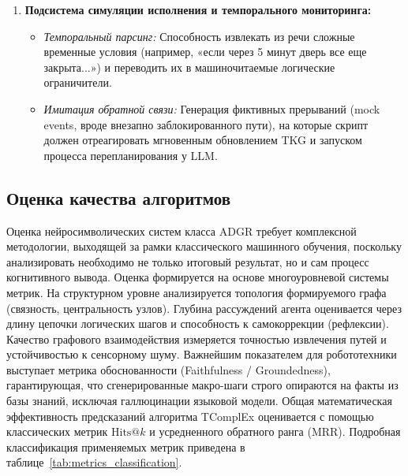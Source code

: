 \begin{enumerate}
    \item \textbf{Подсистема симуляции исполнения и темпорального мониторинга:}
    \begin{itemize}
        \item \textit{Темпоральный парсинг:} Способность извлекать из речи сложные временные условия (например, «если через 5 минут дверь все еще закрыта...») и переводить их в машиночитаемые логические ограничители.
        \item \textit{Имитация обратной связи:} Генерация фиктивных прерываний (mock events, вроде внезапно заблокированного пути), на которые скрипт должен отреагировать мгновенным обновлением TKG и запуском процесса перепланирования у LLM.
    \end{itemize}
\end{enumerate}

\subsection*{Оценка качества алгоритмов}

Оценка нейросимволических систем класса ADGR требует комплексной методологии, выходящей за рамки классического машинного обучения, поскольку анализировать необходимо не только итоговый результат, но и сам процесс когнитивного вывода. Оценка формируется на основе многоуровневой системы метрик. На структурном уровне анализируется топология формируемого графа (связность, центральность узлов). Глубина рассуждений агента оценивается через длину цепочки логических шагов и способность к самокоррекции (рефлексии). Качество графового взаимодействия измеряется точностью извлечения путей и устойчивостью к сенсорному шуму. Важнейшим показателем для робототехники выступает метрика обоснованности (Faithfulness / Groundedness), гарантирующая, что сгенерированные макро-шаги строго опираются на факты из базы знаний, исключая галлюцинации языковой модели. Общая математическая эффективность предсказаний алгоритма TComplEx оценивается с помощью классических метрик $\text{Hits@}k$ и усредненного обратного ранга (MRR). Подробная классификация применяемых метрик приведена в таблице~\ref{tab:metrics_classification}.


